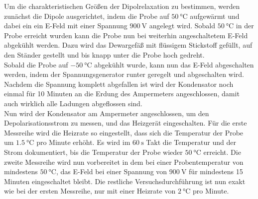     Um die charakteristischen Größen der Dipolrelaxation zu bestimmen, 
    werden zunächst die Dipole ausgerichtet, indem die Probe auf $\SI{50}{\celsius}$ aufgewärmt und dabei ein ein E-Feld mit einer Spannung $\SI{900}{\volt}$ angelegt wird.
    Sobald $\SI{50}{\celsius}$ in der Probe erreicht wurden kann die Probe nun bei weiterhin angeschaltetem E-Feld abgekühlt werden.
    Dazu wird das Dewargefäß mit flüssigem Stickstoff gefüllt, auf den Ständer gestellt und bis knapp unter die Probe hoch gedreht.\\
    Sobald die Probe auf $\SI{-50}{\celsius}$ abgekühlt wurde, kann nun das E-Feld abgeschalten werden, indem der Spannungsgenerator runter geregelt und abgeschalten wird.
    Nachdem die Spannung komplett abgefallen ist wird der Kondensator noch einmal für 10 Minuten an die Erdung des Ampermeters angeschlossen, damit auch wirklich alle Ladungen abgeflossen sind.\\
    Nun wird der Kondensator am Ampermeter angeschlossen, um den Depolarisationsstrom zu messen, und das Heizgerät eingeschalten.
    Für die erste Messreihe wird die Heizrate so eingestellt, dass sich die Temperatur der Probe um $\SI{1.5}{\celsius}$ pro Minute erhöht.
    Es wird im $\SI{60}{\second}$ Takt die Temperatur und der Strom dokumentiert, bis die Temperatur der Probe wieder $\SI{50}{\celsius}$ erreicht. 
    Die zweite Messreihe wird nun vorbereitet in dem bei einer Probentemperatur von mindestens $\SI{50}{\celsius}$, das E-Feld bei einer Spannung von $\SI{900}{\volt}$ für mindestens 15 Minuten eingeschaltet bleibt.
    Die restliche Versuchsdurchführung ist nun exakt wie bei der ersten Messreihe, nur mit einer Heizrate von $\SI{2}{\celsius}$ pro Minute.
